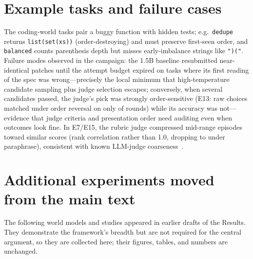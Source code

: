 \documentclass[11pt]{article}
\begin{document}
\section{Example tasks and failure cases}\label{app:examples}
The coding-world tasks pair a buggy function with hidden tests; e.g.\
\texttt{dedupe} returns \texttt{list(set(xs))} (order-destroying) and must
preserve first-seen order, and \texttt{balanced} counts parenthesis depth but
misses early-imbalance strings like \texttt{")("}. Failure modes observed in
the campaign: the 1.5B baseline resubmitted near-identical patches until the
attempt budget expired on tasks where its first reading of the spec was
wrong---precisely the local minimum that high-temperature candidate sampling
plus judge selection escapes; conversely, when several candidates passed, the
judge's pick was strongly order-sensitive (E13: raw choices matched under
order reversal on only \OrderConsistency{} of rounds) while its accuracy was
not---evidence that judge criteria and presentation order need auditing even
when outcomes look fine. In E7/E15, the rubric judge compressed mid-range
episodes toward similar scores (rank correlation \JudgeSpearman{} rather than
1.0, dropping to \RubricParaRho{} under paraphrase), consistent with known
LLM-judge coarseness~\cite{llmjudge2023}.

\section{Additional experiments moved from the main text}\label{app:more}
The following world models and studies appeared in earlier drafts of the Results. They demonstrate the framework's breadth but are not required for the central argument, so they are collected here; their figures, tables, and numbers are unchanged.
\end{document}
